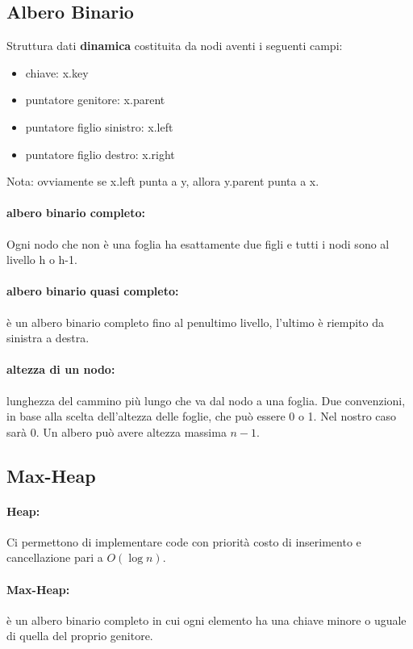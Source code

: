 \documentclass{article}
\begin{document}
\subsection{Albero Binario} %
Struttura dati \textbf{dinamica} costituita da nodi aventi i seguenti campi:
\begin{itemize}
    \item chiave: x.key
    \item puntatore genitore: x.parent
    \item puntatore figlio sinistro: x.left
    \item puntatore figlio destro: x.right
\end{itemize}
Nota: ovviamente se x.left punta a y, allora y.parent punta a x. 

\paragraph{albero binario completo:} Ogni nodo che non è una foglia ha esattamente due figli e tutti i 
nodi sono al livello h o h-1.

\paragraph{albero binario quasi completo:} è un albero binario completo fino al penultimo livello, l'ultimo è 
riempito da sinistra a destra.

\paragraph{altezza di un nodo:} lunghezza del cammino più lungo che va dal nodo a una foglia. Due convenzioni, in base
alla scelta dell'altezza delle foglie, che può essere 0 o 1. Nel nostro caso sarà 0. 
Un albero può avere altezza massima $n-1$.



\subsection{Max-Heap} %
\paragraph{Heap:} Ci permettono di implementare code con priorità costo di inserimento e cancellazione pari a $O(\log n)$.

\paragraph{Max-Heap:} è un albero binario completo in cui ogni elemento ha una chiave minore o uguale di quella 
del proprio genitore.
\end{document}
